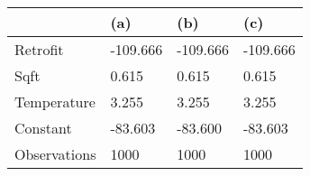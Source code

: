 \begin{tabular}{llll}
\toprule
{} &       (a) &       (b) &       (c) \\
\midrule
Retrofit     &  -109.666 &  -109.666 &  -109.666 \\
Sqft         &     0.615 &     0.615 &     0.615 \\
Temperature  &     3.255 &     3.255 &     3.255 \\
Constant     &   -83.603 &   -83.600 &   -83.603 \\
Observations &      1000 &      1000 &      1000 \\
\bottomrule
\end{tabular}

